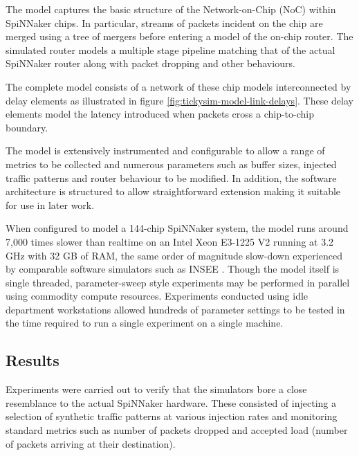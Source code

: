 			The model captures the basic structure of the Network-on-Chip (NoC) within
			SpiNNaker chips. In particular, streams of packets incident on the chip
			are merged using a tree of mergers before entering a model of the on-chip
			router. The simulated router models a multiple stage pipeline matching
			that of the actual SpiNNaker router along with packet dropping and other
			behaviours.
			
			The complete model consists of a network of these chip models
			interconnected by delay elements as illustrated in figure
			\ref{fig:tickysim-model-link-delays}.  These delay elements model the
			latency introduced when packets cross a chip-to-chip boundary.
			
			The model is extensively instrumented and configurable to allow a range of
			metrics to be collected and numerous parameters such as buffer sizes,
			injected traffic patterns and router behaviour to be modified. In
			addition, the software architecture is structured to allow straightforward
			extension making it suitable for use in later work.
			
			When configured to model a 144-chip SpiNNaker system, the model runs
			around 7,000 times slower than realtime on an Intel Xeon E3-1225 V2
			running at 3.2 GHz with 32 GB of RAM, the same order of magnitude
			slow-down experienced by comparable software simulators such as INSEE
			\cite{navaridas11insee}. Though the model itself is single threaded,
			parameter-sweep style experiments may be performed in parallel using
			commodity compute resources. Experiments conducted using idle department
			workstations allowed hundreds of parameter settings to be tested in the
			time required to run a single experiment on a single machine.
		
		\subsection{Results}
			
			
			Experiments were carried out to verify that the simulators bore a close
			resemblance to the actual SpiNNaker hardware. These consisted of injecting
			a selection of synthetic traffic patterns at various injection rates and
			monitoring standard metrics such as number of packets dropped and accepted
			load (number of packets arriving at their destination).
			
